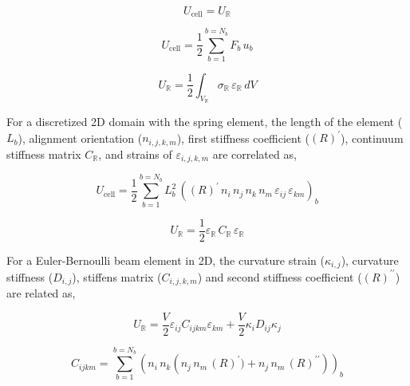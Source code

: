 \begin{equation}
\label{eq:LEM_Mechanical_1}
 U_\text{cell}=U_{\mathbb{R}}
\end{equation}

\begin{equation}
\label{eq:LEM_Mechanical_2}
 U_\text{cell}=\frac{1}{2}\sum_{b=1}^{b=N_b} F_b \, u_b
\end{equation}

\begin{equation}
\label{eq:LEM_Mechanical_3}
 U_{\mathbb{R}} = \frac{1}{2} \int_{V_{\mathbb{R}}} {\sigma_{\mathbb{R}} \, \varepsilon_{\mathbb{R}} \,dV}
\end{equation}

For a discretized 2D domain with the spring element, the length of the element ($L_b$), alignment orientation ($n_{i,j,k,m}$), first stiffness coefficient ($(R)^\prime$), continuum stiffness matrix $C_{\mathbb{R}}$, and strains of $\varepsilon_{i,j,k,m}$ are correlated as,

\begin{equation}
\label{eq:LEM_Mechanical_4}
U_\text{cell}
=
\frac{1}{2}
\sum_{b=1}^{b=N_b} L_b^2 \, \left( (R)^\prime \, n_i \, n_j \, n_k \, n_m \, \varepsilon_{ij} \, \varepsilon_{km} \right)_b
\end{equation}

\begin{equation}
\label{eq:LEM_Mechanical_5}
U_{\mathbb{R}} =
\frac{1}{2} \varepsilon_{\mathbb{R}} \, C_{\mathbb{R}} \, \varepsilon_{\mathbb{R}}
\end{equation}

For a Euler-Bernoulli beam element in 2D, the curvature strain ($\kappa_{i,j}$), curvature stiffness ($D_{i,j}$), stiffens matrix ($C_{i,j,k,m}$) and second stiffness coefficient ($(R)^{\prime\prime}$) are related as,

\begin{equation}
\label{eq:LEM_Mechanical_6}
U_{\mathbb{R}}
=
\frac{V}{2}\varepsilon_{ij}C_{ijkm}\varepsilon_{km}+\frac{V}{2}\kappa_{i}D_{ij}\kappa_j
\end{equation}

\begin{equation}
\label{eq:LEM_Mechanical_7}
C_{ijkm}
=
\sum_{b=1}^{b=N_b} \left( {n_i \, n_k \left( n_j \, n_m \, (R)^\prime)+n_j \, n_m \, (R)^{\prime\prime} \right)}\right)_b
\end{equation}


